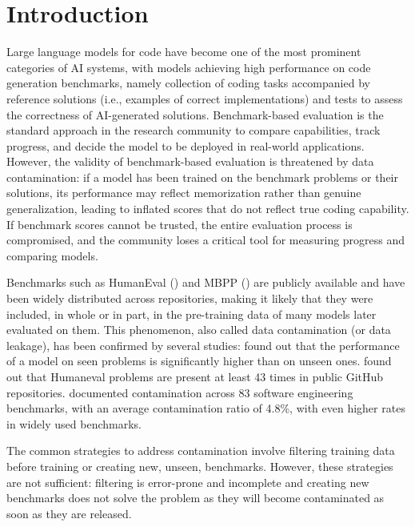 \documentclass[mscthesis]{usiinfthesis}
\begin{document}
\chapter{Introduction}
Large language models for code have become one of the most prominent categories of AI systems, with models achieving high performance on code generation benchmarks, namely collection of coding tasks accompanied by reference solutions (i.e., examples of correct implementations) and tests to assess the correctness of AI-generated solutions. Benchmark-based evaluation is the standard approach in the research community to compare capabilities, track progress, and decide the model to be deployed in real-world applications.
However, the validity of benchmark-based evaluation is threatened by data contamination: if a model has been trained on the benchmark problems or their solutions, its performance may reflect memorization rather than genuine generalization, leading to inflated scores that do not reflect true coding capability.
If benchmark scores cannot be trusted, the entire evaluation process is compromised, and the community loses a critical tool for measuring progress and comparing models.
\par\vspace{1em}
Benchmarks such as HumanEval (\citet{DBLP:journals/corr/abs-2107-03374}) and MBPP (\citet{austin2021programsynthesislargelanguage}) are publicly available and have been widely distributed across repositories, making it likely that they were included, in whole or in part, in the pre-training data of many models later evaluated on them. This phenomenon, also called data contamination (or data leakage), has been confirmed by several studies: \citet{riddell2024quantifyingcontaminationevaluatingcode} found out that the performance of a model on seen problems is significantly higher than on unseen ones.
\citet{matton2024leakagecodegenerationevaluation} found out that Humaneval problems are present at least 43 times in public GitHub repositories.
\citet{zhou2025lessleakbenchinvestigationdataleakage} documented contamination across 83 software engineering benchmarks, with an average contamination ratio of 4.8\%, with even higher rates in widely used benchmarks.
\par\vspace{1em}
The common strategies to address contamination involve filtering training data before training or creating new, unseen, benchmarks.
However, these strategies are not sufficient: filtering is error-prone and incomplete and creating new benchmarks does not solve the problem as they will become contaminated as soon as they are released.
\end{document}
